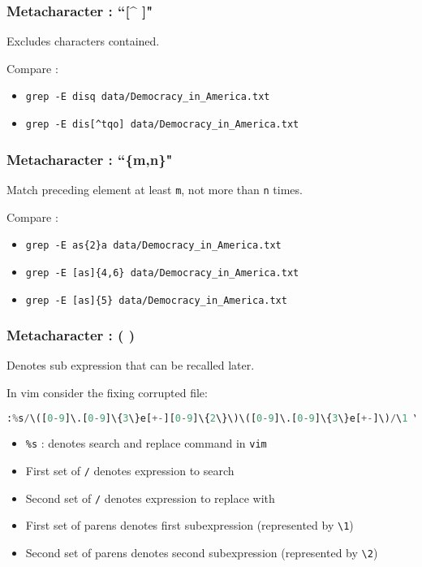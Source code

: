 \documentclass{beamer}
\newcommand{\code}[1]{\colorbox{codegray}{\texttt{#1}}}
\begin{document}
\begin{frame}
\frametitle{Metacharacter : ``[\^{} ]"}
Excludes characters contained. 
\bigskip

Compare :
\begin{itemize}
    \item \code{grep -E disq data/Democracy\_in\_America.txt}
    \pause
    \item \code{grep -E dis[\^{}tqo] data/Democracy\_in\_America.txt}
\end{itemize}
\end{frame}

\begin{frame}
\frametitle{Metacharacter : ``\{m,n\}"}
Match preceding element at least \code{m}, not more than \code{n} times.
\bigskip

Compare :
\begin{itemize}
    \item \code{grep -E as\{2\}a data/Democracy\_in\_America.txt}
    \pause
    \item \code{grep -E [as]\{4,6\} data/Democracy\_in\_America.txt}
    \pause
    \item \code{grep -E [as]\{5\} data/Democracy\_in\_America.txt}
\end{itemize}
\end{frame}

\begin{frame}[fragile]
\frametitle{Metacharacter : ( ) }
\begingroup
Denotes sub expression that can be recalled later.
\bigskip

In vim consider the fixing corrupted file:
\begin{lstlisting}[backgroundcolor = \color{codegray}, language = Python, showstringspaces=false, breaklines=true]
:%s/\([0-9]\.[0-9]\{3\}e[+-][0-9]\{2\}\)\([0-9]\.[0-9]\{3\}e[+-]\)/\1 \2/gc
\end{lstlisting}
\endgroup

\begin{itemize}
    \item \code{\%s} : denotes search and replace command in \code{vim}
    \pause
    \item First set of \code{/} denotes expression to search
    \pause
    \item Second set of \code{/} denotes expression to replace with
    \pause
    \item First set of parens denotes first subexpression (represented by \code{\textbackslash 1})
    \pause
    \item Second set of parens denotes second subexpression (represented by \code{\textbackslash 2})
\end{itemize}



\end{frame}
\end{document}
